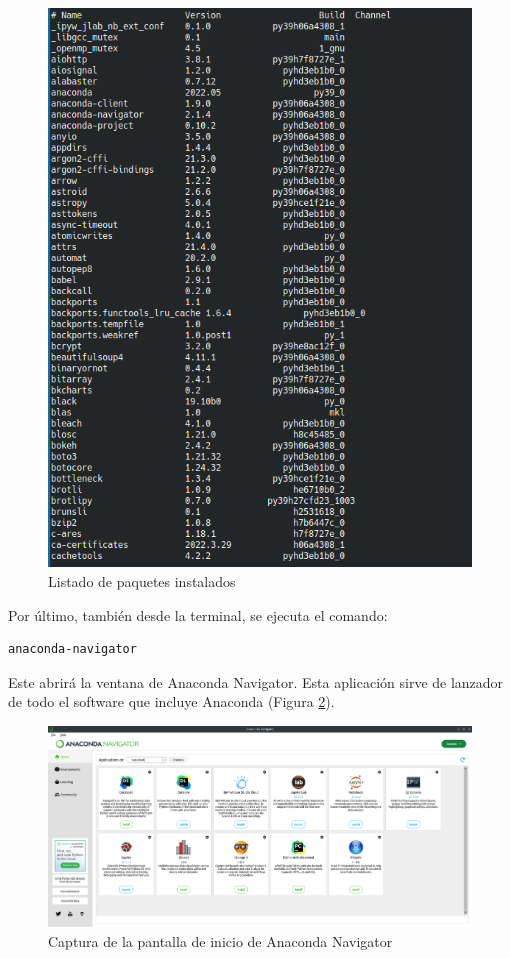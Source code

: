\documentclass[../main.tex]{subfiles}
\begin{document}
\begin{figure}[h]
	\centering
	\includegraphics[width=0.7\linewidth]{../images/anaconda-install-03}
	\caption{Listado de paquetes instalados}
	\label{fig:anaconda-install-03}
\end{figure}

Por último, también desde la terminal, se ejecuta el comando:

\begin{lstlisting}[language=bash]
	anaconda-navigator
\end{lstlisting}

Este abrirá la ventana de Anaconda Navigator. Esta aplicación sirve de lanzador de todo el software que incluye Anaconda (Figura \ref{fig:anaconda-navigator}).

\begin{figure}[h]
	\centering
	\includegraphics[width=0.7\linewidth]{../images/anaconda-navigator}
	\caption{Captura de la pantalla de inicio de Anaconda Navigator}
	\label{fig:anaconda-navigator}
\end{figure}
\end{document}
